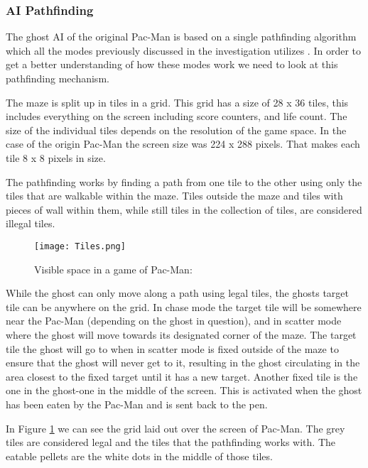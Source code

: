 
\subsubsection{AI Pathfinding}\label{ssub:pathfinding}
The ghost AI of the original Pac-Man is based on a single pathfinding algorithm which all the modes previously discussed in the investigation utilizes \cite{Pittman2011}.
In order to get a better understanding of how these modes work we need to look at this pathfinding mechanism.

The maze is split up in tiles in a grid.
This grid has a size of 28 x 36 tiles, this includes everything on the screen including score counters, and life count.
The size of the individual tiles depends on the resolution of the game space.
In the case of the origin Pac-Man the screen size was 224 x 288 pixels.
That makes each tile 8 x 8 pixels in size.

The pathfinding works by finding a path from one tile to the other using only the tiles that are walkable within the maze.
Tiles outside the maze and tiles with pieces of wall within them, while still tiles in the collection of tiles, are considered illegal tiles.

\begin{figure}[!htbp]
\centering
\texttt{[image: Tiles.png]}
\caption{Visible space in a game of Pac-Man: \cite{Pittman2011} }
\label{fig:Pacman_visible_space}
\end{figure}

While the ghost can only move along a path using legal tiles, the ghosts target tile can be anywhere on the grid.
In chase mode the target tile will be somewhere near the Pac-Man (depending on the ghost in question), and in scatter mode where the ghost will move towards its designated corner of the maze.
The target tile the ghost will go to when in scatter mode is fixed outside of the maze to ensure that the ghost will never get to it, resulting in the ghost circulating in the area closest to the fixed target until it has a new target.
Another fixed tile is the one in the ghost-one in the middle of the screen.
This is activated when the ghost has been eaten by the Pac-Man and is sent back to the pen.

In Figure \ref{fig:Pacman_visible_space} we can see the grid laid out over the screen of Pac-Man. The grey tiles are considered legal and the tiles that the pathfinding works with. The eatable pellets are the white dots in the middle of those tiles.

